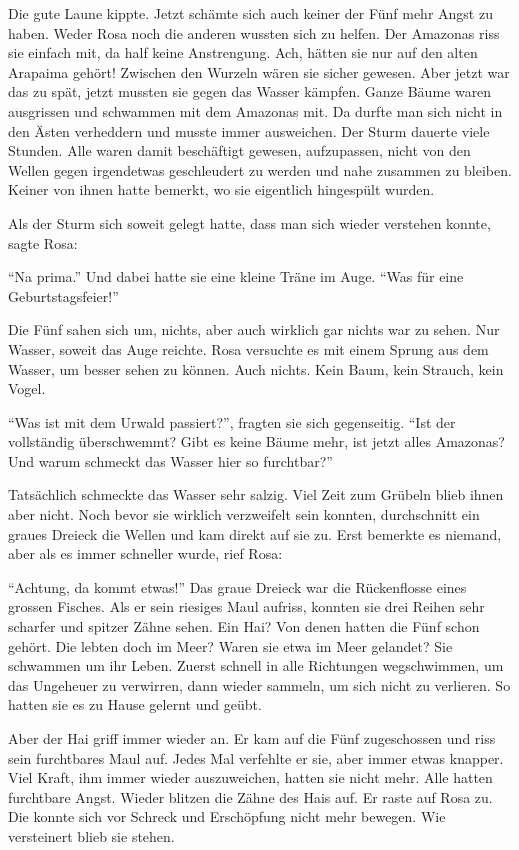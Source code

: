 Die gute Laune kippte. Jetzt schämte sich auch keiner der Fünf mehr Angst zu haben. Weder Rosa noch die anderen wussten sich zu helfen. Der Amazonas riss sie einfach mit, da half keine Anstrengung. Ach, hätten sie nur auf den alten Arapaima gehört! Zwischen den Wurzeln wären sie sicher gewesen. Aber jetzt war das zu spät, jetzt mussten sie gegen das Wasser kämpfen. Ganze Bäume waren ausgrissen und schwammen mit dem Amazonas mit. Da durfte man sich nicht in den Ästen verheddern und musste immer ausweichen. Der Sturm dauerte viele Stunden. Alle waren damit beschäftigt gewesen, aufzupassen, nicht von den Wellen gegen irgendetwas geschleudert zu werden und nahe zusammen zu bleiben. Keiner von ihnen hatte bemerkt, wo sie eigentlich hingespült wurden.

Als der Sturm sich soweit gelegt hatte, dass man sich wieder verstehen konnte, sagte Rosa:

\enquote{Na prima.} Und dabei hatte sie eine kleine Träne im Auge. \enquote{Was für eine Geburtstagsfeier!}

Die Fünf sahen sich um, nichts, aber auch wirklich gar nichts war zu sehen. Nur Wasser, soweit das Auge reichte. Rosa versuchte es mit einem Sprung aus dem Wasser, um besser sehen zu können. Auch nichts. Kein Baum, kein Strauch, kein Vogel.

\enquote{Was ist mit dem Urwald passiert?}, fragten sie sich gegenseitig. \enquote{Ist der vollständig überschwemmt? Gibt es keine Bäume mehr, ist jetzt alles Amazonas? Und warum schmeckt das Wasser hier so furchtbar?} 

Tatsächlich schmeckte das Wasser sehr salzig. Viel Zeit zum Grübeln blieb ihnen aber nicht. Noch bevor sie wirklich verzweifelt sein konnten, durchschnitt ein graues Dreieck die Wellen und kam direkt auf sie zu. Erst bemerkte es niemand, aber als es immer schneller wurde, rief Rosa:

\enquote{Achtung, da kommt etwas!} Das graue Dreieck war die Rückenflosse eines grossen Fisches. Als er sein riesiges Maul aufriss, konnten sie drei Reihen sehr scharfer und spitzer Zähne sehen. Ein Hai? Von denen hatten die Fünf schon gehört. Die lebten doch im Meer? Waren sie etwa im Meer gelandet? Sie schwammen um ihr Leben. Zuerst schnell in alle Richtungen wegschwimmen, um das Ungeheuer zu verwirren, dann wieder sammeln, um sich nicht zu verlieren. So hatten sie es zu Hause gelernt und geübt.

Aber der Hai griff immer wieder an. Er kam auf die Fünf zugeschossen und riss sein furchtbares Maul auf. Jedes Mal verfehlte er sie, aber immer etwas knapper. Viel Kraft, ihm immer wieder auszuweichen, hatten sie nicht mehr. Alle hatten furchtbare Angst. Wieder blitzen die Zähne des Hais auf. Er raste auf Rosa zu. Die konnte sich vor Schreck und Erschöpfung nicht mehr bewegen. Wie versteinert blieb sie stehen. 

